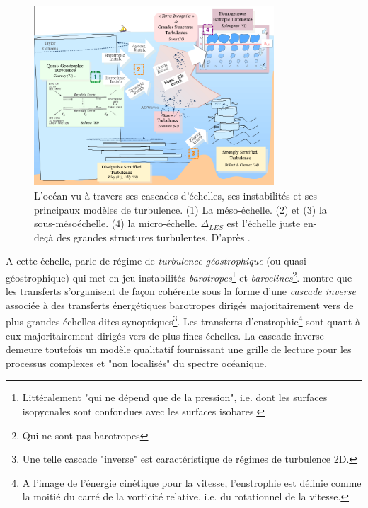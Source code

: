 \begin{figure}[!h]
  \centering
  \includegraphics[width=0.8\textwidth]{./INTRO/Ocean_Scales.png}
  \caption{L'océan vu à travers ses cascades d'échelles, ses instabilités et ses principaux modèles de turbulence. (1) La méso-échelle. (2) et (3) la sous-mésoéchelle. (4) la micro-échelle. $\Delta_{LES}$ est l'échelle juste en-deçà des grandes structures turbulentes. D'après \citet{charney_geostrophic_1971, salmon_baroclinic_1980,riley_direct_1981,lilly_stratified_1983,zakharov_wave_1992,billant_zigzag_2010,kolmogorov_local_1941,scotti_large_2010}.}
  \label{fig_ocean_scales}
\end{figure}
\citep{}
A cette échelle, \citet{charney_geostrophic_1971} parle de régime de \textit{turbulence géostrophique} (ou quasi-géostrophique) qui met en jeu instabilités \textit{barotropes}\footnote{Littéralement "qui ne dépend que de la pression", i.e. dont les surfaces isopycnales sont confondues avec les surfaces isobares.} et \textit{baroclines}\footnote{Qui ne sont pas barotropes}. \cite{salmon_baroclinic_1980} montre que les transferts s'organisent de façon cohérente sous la forme d'une \textit{cascade inverse} associée à des transferts énergétiques barotropes dirigés majoritairement vers de plus grandes échelles dites synoptiques\footnote{Une telle cascade "inverse" est caractéristique de régimes de turbulence 2D.}. Les transferts d'enstrophie\footnote{A l'image de l'énergie cinétique pour la vitesse, l'enstrophie est définie comme la moitié du carré de la vorticité relative, i.e. du rotationnel de la vitesse.} sont quant à eux majoritairement dirigés vers de plus fines échelles. La cascade inverse demeure toutefois un modèle qualitatif fournissant une grille de lecture pour les processus complexes et "non localisés" du spectre océanique.

